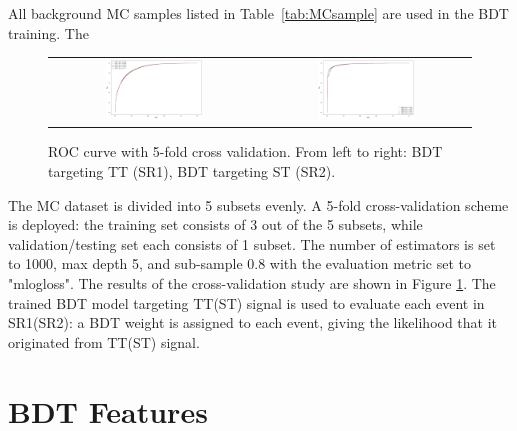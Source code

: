 All background \ac{MC} samples listed in Table~\ref{tab:MCsample} are used in the \ac{BDT} training. The 

\begin{figure}[tbh!]
 \begin{center}
 \begin{tabular}{cc}
  \includegraphics[width=0.48\textwidth]{figures/Part3/BDT/5foldTT}&
    \includegraphics[width=0.48\textwidth]{figures/Part3/BDT/5foldST}\\
 \end{tabular}
 \caption{ROC curve with 5-fold cross validation. From left to right: BDT targeting TT (SR1), BDT targeting ST (SR2).}
 \label{fig:5fold}
 \end{center}
\end{figure}

The MC dataset is divided into 5 subsets evenly. A 5-fold cross-validation scheme is deployed: the training set consists of 3 out of the 5 subsets, while validation/testing set each consists of 1 subset. The number of estimators is set to 1000, max depth 5, and sub-sample 0.8 with the evaluation metric set to "mlogloss".  The results of the cross-validation study are shown in Figure \ref{fig:5fold}. The trained BDT model targeting TT(ST) signal is used to evaluate each event in SR1(SR2): a BDT weight is assigned to each event, giving the likelihood that it originated from TT(ST) signal. 

\section{BDT Features}
\label{sec:Input}

